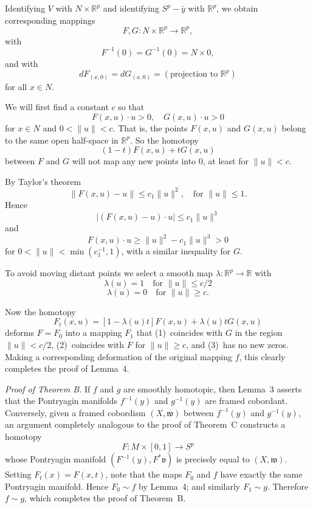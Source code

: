 
Identifying $V$ with $N \times \mathbb{R}^p$ and identifying $S^p - \bar{y}$ with $\mathbb{R}^p$, we obtain corresponding mappings
\[
F, G : N \times \mathbb{R}^p \to \mathbb{R}^p,
\]
with
\[
F^{-1}(0) = G^{-1}(0) = N \times 0,
\]
and with
\[
dF_{(x, 0)} = dG_{(x, 0)} = (\text{projection to } \mathbb{R}^p)
\]
for all $x \in N$.

We will first find a constant $c$ so that
\[
F(x, u) \cdot u > 0, \quad G(x, u) \cdot u > 0
\]
for $x \in N$ and $0 < \|u\| < c$. That is, the points $F(x, u)$ and $G(x, u)$ belong to the same open half-space in $\mathbb{R}^p$. So the homotopy
\[
(1 - t) F(x, u) + t G(x, u)
\]
between $F$ and $G$ will not map any new points into $0$, at least for $\|u\| < c$.

By Taylor's theorem
\[
\|F(x, u) - u\| \le c_1 \|u\|^2, \quad \text{for } \|u\| \le 1.
\]
Hence
\[
|(F(x, u) - u) \cdot u| \le c_1 \|u\|^3
\]
and
\[
F(x, u) \cdot u \ge \|u\|^2 - c_1 \|u\|^3 > 0
\]
for $0 < \|u\| < \min(c_1^{-1}, 1)$, with a similar inequality for $G$.

To avoid moving distant points we select a smooth map $\lambda : \mathbb{R}^p \to \mathbb{R}$ with
\[
\lambda(u) = 1 \quad \text{for } \|u\| \le c/2
\]
\[
\lambda(u) = 0 \quad \text{for } \|u\| \ge c.
\]

Now the homotopy
\[
F_t(x, u) = [1 - \lambda(u) t] F(x, u) + \lambda(u) t G(x, u)
\]
deforms $F = F_0$ into a mapping $F_1$ that (1)~coincides with $G$ in the region $\|u\| < c/2$, (2)~coincides with $F$ for $\|u\| \ge c$, and (3)~has no new zeros. Making a corresponding deformation of the original mapping $f$, this clearly completes the proof of Lemma~4.




\noindent\textit{Proof of Theorem B.}
If $f$ and $g$ are smoothly homotopic, then Lemma~3 asserts that the Pontryagin manifolds $f^{-1}(y)$ and $g^{-1}(y)$ are framed cobordant. Conversely, given a framed cobordism $(X, \mathfrak{w})$ between $f^{-1}(y)$ and $g^{-1}(y)$, an argument completely analogous to the proof of Theorem~C constructs a homotopy
\[
F : M \times [0, 1] \to S^p
\]
whose Pontryagin manifold $(F^{-1}(y), F^*\mathfrak{v})$ is precisely equal to $(X, \mathfrak{w})$. Setting $F_t(x) = F(x, t)$, note that the maps $F_0$ and $f$ have exactly the same Pontryagin manifold. Hence $F_0 \sim f$ by Lemma~4; and similarly $F_1 \sim g$. Therefore $f \sim g$, which completes the proof of Theorem~B.

